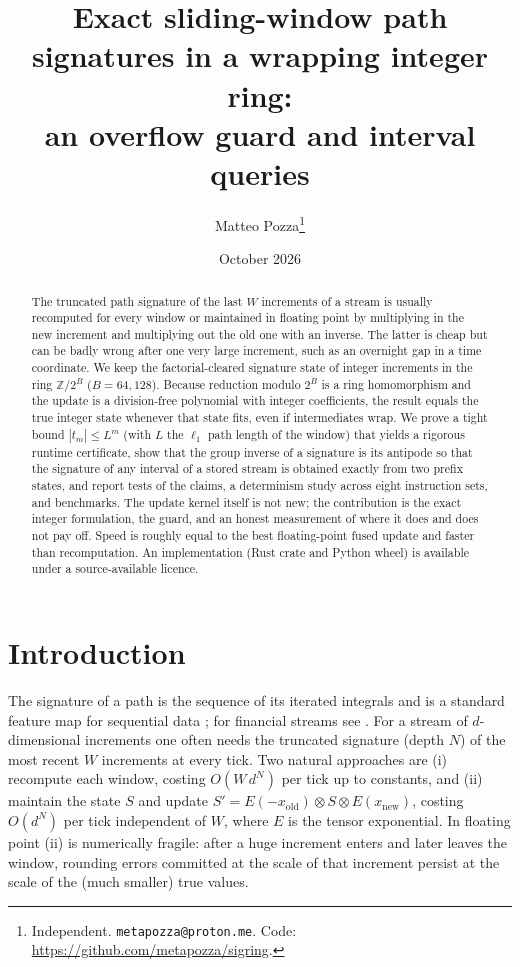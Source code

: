 \documentclass[11pt]{article}
\title{Exact sliding-window path signatures in a wrapping integer ring:\\ an overflow guard and interval queries}
\author{Matteo Pozza\thanks{Independent. \texttt{metapozza@proton.me}. Code: \url{https://github.com/metapozza/sigring}.}}
\date{October 2026}
\theoremstyle{remark}\newtheorem{remark}{Remark}
\newcommand{\Z}{\mathbb{Z}}
\begin{document}
\maketitle
\begin{abstract}
The truncated path signature of the last $W$ increments of a stream is usually recomputed for every window or maintained in floating point by multiplying in the new increment and multiplying out the old one with an inverse. The latter is cheap but can be badly wrong after one very large increment, such as an overnight gap in a time coordinate. We keep the factorial-cleared signature state of integer increments in the ring $\Z/2^{B}$ ($B=64,128$). Because reduction modulo $2^B$ is a ring homomorphism and the update is a division-free polynomial with integer coefficients, the result equals the true integer state whenever that state fits, even if intermediates wrap. We prove a tight bound $|t_m|\le L^m$ (with $L$ the $\ell_1$ path length of the window) that yields a rigorous runtime certificate, show that the group inverse of a signature is its antipode so that the signature of any interval of a stored stream is obtained exactly from two prefix states, and report tests of the claims, a determinism study across eight instruction sets, and benchmarks. The update kernel itself is not new; the contribution is the exact integer formulation, the guard, and an honest measurement of where it does and does not pay off. Speed is roughly equal to the best floating-point fused update and faster than recomputation. An implementation (Rust crate and Python wheel) is available under a source-available licence.
\end{abstract}

\section{Introduction}
The signature of a path is the sequence of its iterated integrals and is a standard feature map for sequential data \cite{chen1958,lyons1998}; for financial streams see \cite{gyurko2013}. For a stream of $d$-dimensional increments one often needs the truncated signature (depth $N$) of the most recent $W$ increments at every tick. Two natural approaches are (i) recompute each window, costing $O(W\,d^N)$ per tick up to constants, and (ii) maintain the state $S$ and update $S'=E(-x_{\mathrm{old}})\otimes S\otimes E(x_{\mathrm{new}})$, costing $O(d^N)$ per tick independent of $W$, where $E$ is the tensor exponential. In floating point (ii) is numerically fragile: after a huge increment enters and later leaves the window, rounding errors committed at the scale of that increment persist at the scale of the (much smaller) true values.
\end{document}
